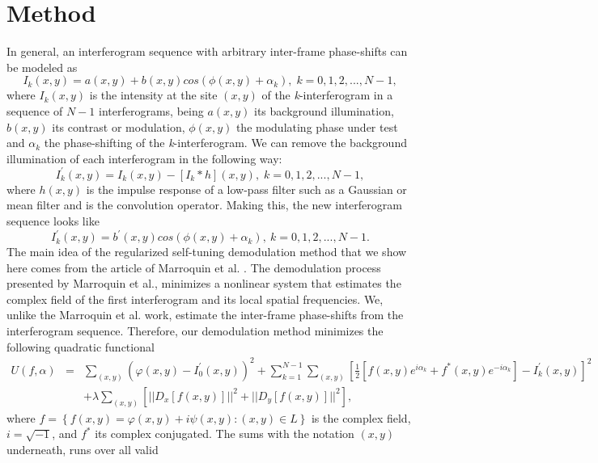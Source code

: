 \section{Method }

In general, an interferogram sequence with arbitrary inter-frame phase-shifts
can be modeled as 
\begin{equation}
I_{k}(x,y)=a(x,y)+b(x,y)cos(\phi(x,y)+\alpha_{k}),\; k=0,1,2,...,N-1,\label{eq:
Ik}
\end{equation}
where $I_{k}(x,y)$ is the intensity at the site $(x,y)$ of the
\emph{k}-interferogram in a sequence of $N-1$ interferograms, being
$a(x,y)$ its background illumination, $b(x,y)$ its contrast or modulation,
$\phi(x,y)$ the modulating phase under test and $\alpha_{k}$ the
phase-shifting of the \emph{k}-interferogram. We can remove the background
illumination of each interferogram in the following way: 
\begin{equation}
I_{k}^{'}(x,y)=I_{k}(x,y)-[I_{k}*h](x,y),\; k=0,1,2,...,N-1,\label{eq:I'}
\end{equation}
where $h(x,y)$ is the impulse response of a low-pass filter such
as a Gaussian or mean filter and \textasteriskcentered{} is the convolution
operator\cite{Jahne}. Making this, the new interferogram sequence looks
like 
\begin{equation}
I_{k}^{'}(x,y)=b^{'}(x,y)cos(\phi(x,y)+\alpha_{k}),\: k=0,1,2,...,N-1.\label{eq:
I'2}
\end{equation}
The main idea of the regularized self-tuning demodulation method that
we show here comes from the article of Marroquin et al. \cite{RQF}.
The demodulation process presented by Marroquin et al., minimizes
a nonlinear system that estimates the complex field of the first interferogram
and its local spatial frequencies. We, unlike the Marroquin et al.
work, estimate the inter-frame phase-shifts from the interferogram
sequence. Therefore, our demodulation method minimizes the following
quadratic functional
\begin{eqnarray}
U(f,\alpha) & = & \sum_{(x,y)}(\varphi(x,y)-I_{0}^{'}(x,y))^{2}+\sum_{k=1}^{N-1}
\sum_{(x,y)}[\frac{1}{2}[f(x,y)e^{i\alpha_{k}}+f^{*}(x,y)e^{-i\alpha_{k}}]-I_{k}
^{'}(x,y)]^{2}\label{eq:U}\\
 &  & +\lambda\sum_{(x,y)}[||D_{x}[f(x,y)]||^{2}+||D_{y}[f(x,y)]||^{2}],\nonumber 
\end{eqnarray}
where $f=\left\{ f(x,y)=\varphi(x,y)+i\psi(x,y):(x,y)\in L\right\} $
is the complex field, $i=\sqrt{-1}$, and $f^{*}$ its complex conjugated.
The sums with the notation $(x,y)$ underneath, runs over all valid
